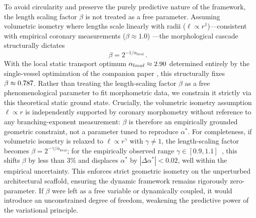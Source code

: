 \documentclass[11pt,a4paper]{article}
\theoremstyle{remark}
\begin{document}
To avoid circularity and preserve the purely predictive nature of the framework,
the length scaling factor $\beta$ is not treated as a free parameter. Assuming
volumetric isometry where lengths scale linearly with radii ($\ell \propto
r^1$)---consistent with empirical coronary measurements ($\beta \approx 1.0$)
\cite{Kassab1993}---the morphological cascade structurally dictates
\[
  \beta = 2^{-1/\alpha_\mathrm{local}}\,.
\]
With the local static transport optimum $\alpha_{local} \approx 2.90$
determined entirely by the single-vessel optimization of the companion paper
\cite{Marchesi2026static}, this structurally fixes $\beta \approx 0.787$.
Rather than treating the length-scaling factor $\beta$ as a free
phenomenological parameter to fit morphometric data, we constrain it strictly
via this theoretical static ground state. Crucially, the volumetric isometry
assumption $\ell \propto r$ is independently supported by coronary morphometry
\cite{Kassab1993} without reference to any branching-exponent measurement:
$\beta$ is therefore an empirically grounded geometric constraint, not a
parameter tuned to reproduce $\alpha^*$.
For completeness, if volumetric isometry is relaxed to
$\ell \propto r^\gamma$ with $\gamma \neq 1$, the length-scaling
factor becomes $\beta = 2^{-\gamma/\alpha_{\mathrm{local}}}$; for
the empirically observed range $\gamma \in [0.9, 1.1]$~\cite{Kassab1993},
this shifts $\beta$ by less than $3\%$ and displaces $\alpha^*$ by
$|\Delta\alpha^*| < 0.02$, well within the empirical uncertainty.
This enforces strict geometric isometry on the unperturbed architectural
scaffold, ensuring the dynamic framework remains rigorously zero-parameter. If
$\beta$ were left as a free variable or dynamically coupled, it would introduce
an unconstrained degree of freedom, weakening the predictive power of the
variational principle.
\end{document}
